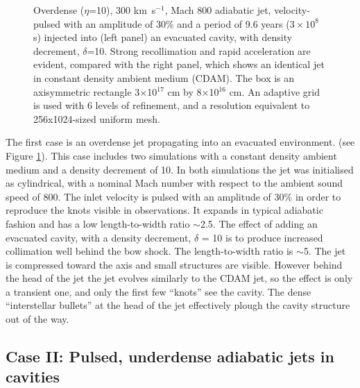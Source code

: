 \begin{figure}[t]
\begin{center}
\begin{minipage}[t]{.48\linewidth}
   \end{minipage} 
\caption{
Overdense ($\eta$=10), 300 km~s$^{-1}$, Mach 800 adiabatic jet, velocity-pulsed with an amplitude of 30\% and a period of 9.6 years ($3\times10^8$ s) injected into 
(left panel)
an evacuated cavity, with density decrement, $\delta$=10.
Strong recollimation and rapid acceleration are evident, compared with the 
right panel, which shows an identical jet in constant density ambient medium (CDAM).
The box is an axisymmetric rectangle 
3$\times$10$^{17}$ cm by
8$\times$10$^{16}$ cm.
An adaptive grid is used with 6 levels of refinement, and a resolution equivalent to 256x1024-sized uniform mesh.
}
\label{fig:flash:eta:10}       %
\end{center}
\end{figure}


The first case is an overdense jet propagating into an evacuated environment. 
(see Figure \ref{fig:flash:eta:10}).
This case includes two simulations with a constant density ambient medium and a density decrement of 10.
In both simulations the jet was initialised as cylindrical, with a nominal Mach number with respect to the ambient sound speed of 800.
The inlet velocity is pulsed with an amplitude of 30\% in order to reproduce the knots visible in observations.
It expands in typical adiabatic fashion and has a low length-to-width ratio $\sim$2.5.
The effect of adding an evacuated cavity, with a density decrement, $\delta$ = 10 is to produce increased collimation well behind the bow shock.
The length-to-width ratio is $\sim$5.
The jet is compressed toward the axis and small structures are visible.
However behind the head of the jet the jet evolves similarly to the CDAM jet, so the effect is only a transient one, and only the first few ``knots'' see the cavity.
The dense ``interstellar bullets'' at the head of the jet effectively plough the cavity structure out of the way.


\subsection{Case II: Pulsed, underdense adiabatic jets in cavities}

